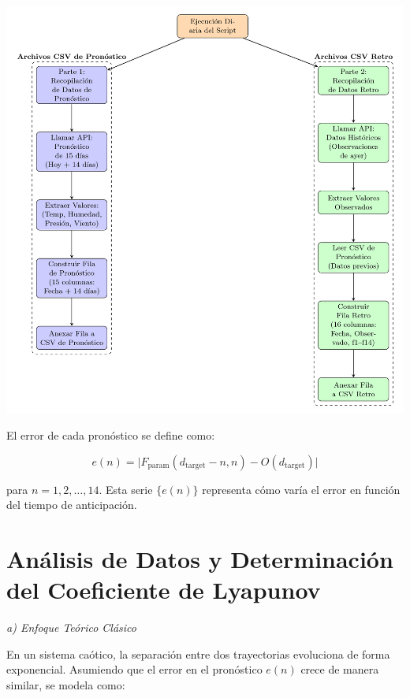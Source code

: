 \documentclass[
  10pt,
  a4paper,
  DIV=11,
  numbers=noendperiod,
  open=any]{scrreprt}
\numberwithin{equation}{chapter}
\numberwithin{equation}{chapter}
\renewcommand{\[}{\begin{equation}}
\renewcommand{\]}{\end{equation}}
\begin{document}
\includegraphics[width=1\linewidth,height=\textheight,keepaspectratio]{03-meteorologia/EjecucionDiaria.png}

El error de cada pronóstico se define como:

\begin{equation}

e(n) = \bigl| F_{\text{param}}(d_{\text{target}}-n, n) - O(d_{\text{target}}) \bigr|

\end{equation}

para \(n = 1,2,\dots,14\). Esta serie \(\{e(n)\}\) representa cómo varía
el error en función del tiempo de anticipación.

\section{Análisis de Datos y Determinación del Coeficiente de
Lyapunov}\label{anuxe1lisis-de-datos-y-determinaciuxf3n-del-coeficiente-de-lyapunov}

\emph{a) Enfoque Teórico Clásico}

En un sistema caótico, la separación entre dos trayectorias evoluciona
de forma exponencial. Asumiendo que el error en el pronóstico \(e(n)\)
crece de manera similar, se modela como:
\end{document}
